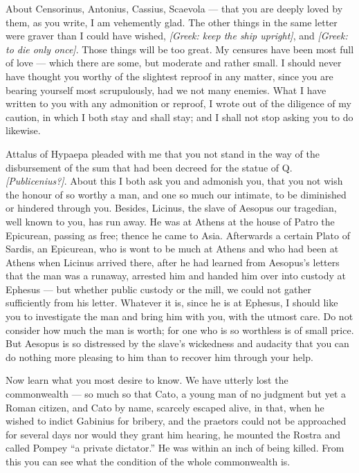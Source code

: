  About Censorinus, Antonius, Cassius, Scaevola --- that you are deeply loved by them, as you write, I am vehemently glad. The other things in the same letter were graver than I could have wished, \textit{[Greek: keep the ship upright]}, and \textit{[Greek: to die only once]}. Those things will be too great. My censures have been most full of love --- which there are some, but moderate and rather small. I should never have thought you worthy of the slightest reproof in any matter, since you are bearing yourself most scrupulously, had we not many enemies. What I have written to you with any admonition or reproof, I wrote out of the diligence of my caution, in which I both stay and shall stay; and I shall not stop asking you to do likewise.

 Attalus of Hypaepa pleaded with me that you not stand in the way of the disbursement of the sum that had been decreed for the statue of Q. \textit{[Publicenius?]}. About this I both ask you and admonish you, that you not wish the honour of so worthy a man, and one so much our intimate, to be diminished or hindered through you. Besides, Licinus, the slave of Aesopus our tragedian, well known to you, has run away. He was at Athens at the house of Patro the Epicurean, passing as free; thence he came to Asia. Afterwards a certain Plato of Sardis, an Epicurean, who is wont to be much at Athens and who had been at Athens when Licinus arrived there, after he had learned from Aesopus's letters that the man was a runaway, arrested him and handed him over into custody at Ephesus --- but whether public custody or the mill, we could not gather sufficiently from his letter. Whatever it is, since he is at Ephesus, I should like you to investigate the man and bring him with you, with the utmost care. Do not consider how much the man is worth; for one who is so worthless is of small price. But Aesopus is so distressed by the slave's wickedness and audacity that you can do nothing more pleasing to him than to recover him through your help.

 Now learn what you most desire to know. We have utterly lost the commonwealth --- so much so that Cato, a young man of no judgment but yet a Roman citizen, and Cato by name, scarcely escaped alive, in that, when he wished to indict Gabinius for bribery, and the praetors could not be approached for several days nor would they grant him hearing, he mounted the Rostra and called Pompey ``a private dictator.'' He was within an inch of being killed. From this you can see what the condition of the whole commonwealth is.

